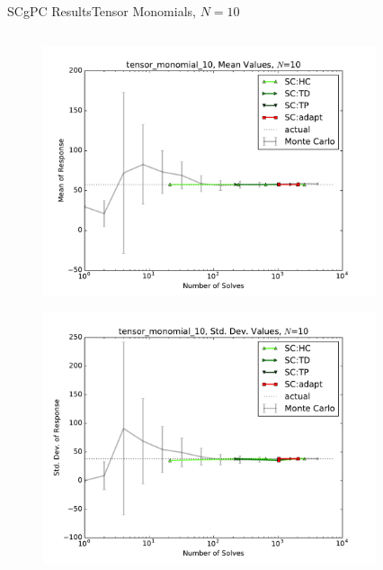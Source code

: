 \documentclass{beamer}
\begin{document}
\begin{frame}{SCgPC Results}{Tensor Monomials, $N=10$}\vspace{-20pt}
 \begin{columns}
   \begin{column}{0.5\textwidth}
        \begin{figure}[h!]
          \centering
          \includegraphics[width=0.8\linewidth]{anlmodels/tensor_monomial_10_mean_vals_nohdmr}
        \end{figure}
        \vspace{-20pt}
        \begin{figure}[h!]
          \centering
          \includegraphics[width=0.8\linewidth]{anlmodels/tensor_monomial_10_var_vals_nohdmr}
        \end{figure}
   \end{column}
   \begin{column}{0.5\textwidth}
        \begin{figure}[h!]
          \centering

\end{figure}
\end{column}
\end{columns}
\end{frame}
\end{document}
